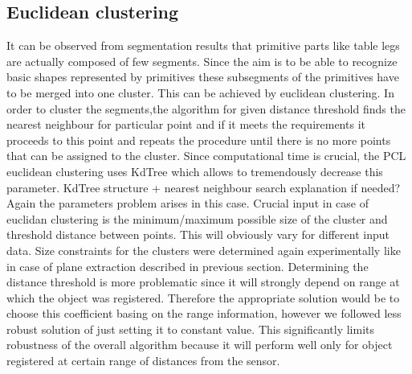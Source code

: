 \documentclass[12pt,oneside]{amsart}
\begin{document}
\subsection{Euclidean clustering}
\indent It can be observed from segmentation results that primitive parts like table legs are actually composed of few segments. Since the aim is to be able to recognize basic shapes represented by primitives these subsegments of the primitives have to be merged into one cluster. This can be achieved by euclidean clustering.
\newline
\indent In order to cluster the segments,the algorithm for given distance threshold finds the nearest neighbour for particular point and if it meets the requirements it proceeds to this point and repeats the procedure until there is no more points that can be assigned to the cluster. Since computational time is crucial, the PCL euclidean clustering uses KdTree which allows to tremendously decrease this parameter. 
\newline\newline
\indent KdTree structure + nearest neighbour search explanation if needed?
\newline\newline
Again the parameters problem arises in this case. Crucial input in case of euclidan clustering is the minimum/maximum possible size of the cluster and threshold distance between points. This will obviously vary for different input data. Size constraints for the clusters were determined again experimentally like in case of plane extraction described in previous section. Determining the distance threshold is more problematic since it will strongly depend on range at which the object was registered. Therefore the appropriate solution would be to choose this coefficient basing on the range information, however we followed less robust solution of just setting it to constant value. This significantly limits robustness of the overall algorithm because it will perform well only for object registered at certain range of distances from the sensor. 
\end{document}
